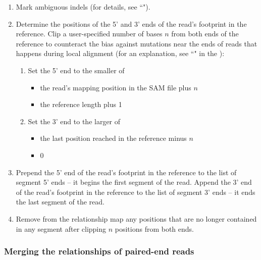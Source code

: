 \documentclass{article}
\begin{document}
\begin{enumerate}
\begin{enumerate}
        \item If the position to be marked already appears in the map because it has another mutation, then add the insertion code on top of the existing relationship code using bitwise OR. For example, if the position 3' of an insertion were already a substitution to T (10000000), then the result would be 10001000 after marking the insertion.
    \end{enumerate}
    \item Mark ambiguous indels (for details, see ``").
    \item Determine the positions of the 5' and 3' ends of the read's footprint in the reference.
    Clip a user-specified number of bases $n$ from both ends of the reference to counteract the bias against mutations near the ends of reads that happens during local alignment (for an explanation, see ``" in the ):
    \begin{enumerate}
        \item Set the 5' end to the smaller of
        \begin{itemize}
            \item the read's mapping position in the SAM file plus $n$
            \item the reference length plus 1
        \end{itemize}
        \item Set the 3' end to the larger of
        \begin{itemize}
            \item the last position reached in the reference minus $n$
            \item 0
        \end{itemize}
    \end{enumerate}
    \item Prepend the 5' end of the read's footprint in the reference to the list of segment 5' ends -- it begins the first segment of the read. Append the 3' end of the read's footprint in the reference to the list of segment 3' ends -- it ends the last segment of the read.
    \item Remove from the relationship map any positions that are no longer contained in any segment after clipping $n$ positions from both ends.
\end{enumerate}

\subsubsection{Merging the relationships of paired-end reads}
\end{document}
